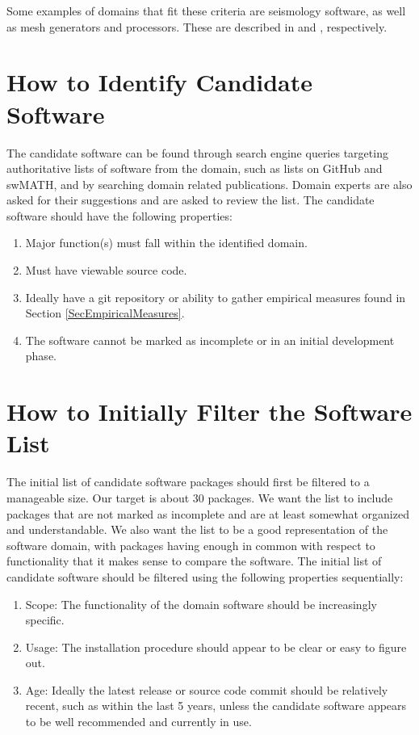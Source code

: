 \documentclass[letterpaper,cleveref]{lipics-v2019}
\theoremstyle{definition}
\begin{document}
Some examples of domains that fit these criteria are seismology software, as well as mesh generators and processors. These are described in \citep{SmithEtAl2018} and \citep{smith2016state}, respectively.


\section{How to Identify Candidate Software} \label{SecIdentifyCandSoft}
The candidate software can be found through search engine queries targeting authoritative lists of software from the domain, such as lists on GitHub and swMATH, and by searching domain related publications. Domain experts are also asked for their suggestions and are asked to review the list. The candidate software should have the following properties:

\begin{enumerate}
	\item Major function(s) must fall within the identified domain.
	\item Must have viewable source code.
	\item Ideally have a git repository or ability to gather empirical measures found in Section \ref{SecEmpiricalMeasures}.
	\item The software cannot be marked as incomplete or in an initial development phase.
\end{enumerate}

\section{How to Initially Filter the Software List} \label{SecInitialFilter}
The initial list of candidate software packages should first be filtered to a manageable size. Our target is about 30 packages. We want the list to include packages that are not marked as incomplete and are at least somewhat organized and understandable. We also want the list to be a good representation of the software domain, with packages having enough in common with respect to functionality that it makes sense to compare the software. The initial list of candidate software should be filtered using the following properties sequentially:

\begin{enumerate}
	\item Scope: The functionality of the domain software should be increasingly specific.
	\item Usage: The installation procedure should appear to be clear or easy to figure out.
    \item Age: Ideally the latest release or source code commit should be relatively recent, such as within the last 5 years, unless the candidate software appears to be well recommended and currently in use.
\end{enumerate}
\end{document}

